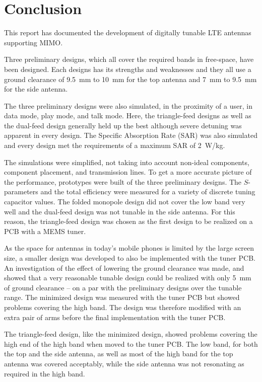 \chapter{Conclusion}
\label{cha:conclusion}
This report has documented the development of digitally tunable LTE antennas supporting MIMO. 

Three preliminary designs, which all cover the required bands in free-space, have been designed. Each designs has its strengths and weaknesses and they all use a ground clearance of \SI{9.5}{mm} to \SI{10}{mm} for the top antenna and \SI{7}{mm} to \SI{9.5}{mm} for the side antenna. 

The three preliminary designs were also simulated, in the proximity of a user, in data mode, play mode, and talk mode. Here, the triangle-feed designs as well as the dual-feed design generally held up the best although severe detuning was apparent in every design. The Specific Absorption Rate (SAR) was also simulated and every design met the requirements of a maximum SAR of \SI{2}{W/kg}.

The simulations were simplified, not taking into account non-ideal components, component placement, and transmission lines. To get a more accurate picture of the performance, prototypes were built of the three preliminary designs. The $S$-parameters and the total efficiency were measured for a variety of discrete tuning capacitor values. The folded monopole design did not cover the low band very well and the dual-feed design was not tunable in the side antenna. For this reason, the triangle-feed design was chosen as the first design to be realized on a PCB with a MEMS tuner.

As the space for antennas in today's mobile phones is limited by the large screen size, a smaller design was developed to also be implemented with the tuner PCB. An investigation of the effect of lowering the ground clearance was made, and showed that a very reasonable tunable design could be realized with only \SI{5}{mm} of ground clearance -- on a par with the preliminary designs over the tunable range. The minimized design was measured with the tuner PCB but showed problems covering the high band. The design was therefore modified with an extra pair of arms before the final implementation with the tuner PCB.

The triangle-feed design, like the minimized design, showed problems covering the high end of the high band when moved to the tuner PCB. The low band, for both the top and the side antenna, as well as most of the high band for the top antenna was covered acceptably, while the side antenna was not resonating as required in the high band.

